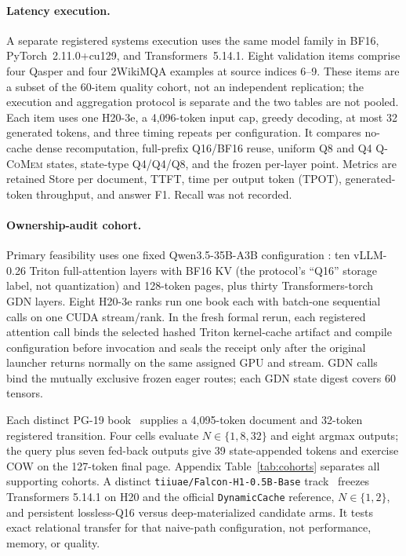 \documentclass{article}
\newcommand{\qcomem}{\textsc{Q-CoMem}}
\begin{document}
\paragraph{Latency execution.}
A separate registered systems execution uses the same model family in BF16,
PyTorch~2.11.0+cu129, and Transformers~5.14.1.  Eight validation items comprise
four Qasper and four 2WikiMQA examples at source indices 6--9.  These items are
a subset of the 60-item quality cohort, not an independent replication; the
execution and aggregation protocol is separate and the two tables are not
pooled.  Each item uses one H20-3e, a 4,096-token input cap, greedy decoding, at
most 32 generated tokens, and three timing repeats per configuration.  It
compares no-cache dense recomputation,
full-prefix Q16/BF16 reuse, uniform Q8 and Q4 \qcomem{} states, state-type
Q4/Q4/Q8, and the frozen per-layer point.  Metrics are retained Store per
document, TTFT, time per output token (TPOT), generated-token throughput, and
answer F1.  Recall was not recorded.

\paragraph{Ownership-audit cohort.}

Primary feasibility uses one fixed Qwen3.5-35B-A3B configuration
\citep{qwen2026qwen35,qwen2026qwen35modelcard}: ten vLLM-0.26 Triton
full-attention layers with BF16 KV (the protocol's ``Q16'' storage label, not
quantization) and 128-token pages, plus thirty
Transformers-torch GDN layers.  Eight H20-3e ranks run one book each with
batch-one sequential calls on one CUDA stream/rank.  In the fresh formal rerun,
each registered attention call binds the selected hashed Triton kernel-cache
artifact and compile configuration before invocation and seals the receipt only
after the original launcher returns normally on the same assigned GPU and
stream.  GDN calls bind the mutually exclusive frozen eager
routes; each GDN state digest covers 60 tensors.

Each distinct PG-19 book~\citep{rae2020compressive} supplies a 4,095-token
document and 32-token registered transition.  Four cells evaluate
$N\in\{1,8,32\}$ and eight argmax outputs; the query plus seven fed-back outputs
give 39 state-appended tokens and exercise COW on the 127-token final page.
Appendix Table~\ref{tab:cohorts} separates all supporting cohorts.  A distinct
\texttt{tiiuae/Falcon-H1-0.5B-Base} track~\citep{zuo2025falconh1} freezes
Transformers 5.14.1 on H20 and the official
\texttt{DynamicCache} reference, $N\in\{1,2\}$, and persistent lossless-Q16
versus deep-materialized candidate arms.  It tests exact relational transfer
for that naive-path configuration, not performance, memory, or quality.
\end{document}
